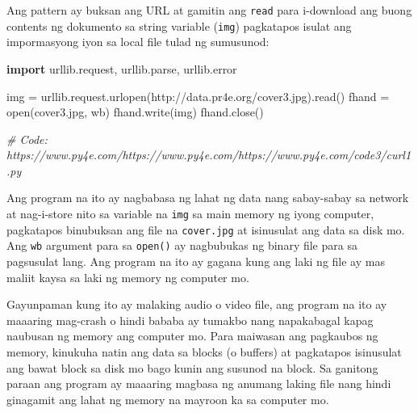 \documentclass[10pt,]{book}
\newenvironment{Shaded}{}{}
\newcommand{\BuiltInTok}[1]{\textcolor[rgb]{0.00,0.50,0.00}{#1}}
\newcommand{\CommentTok}[1]{\textcolor[rgb]{0.38,0.63,0.69}{\textit{#1}}}
\newcommand{\ImportTok}[1]{\textcolor[rgb]{0.00,0.50,0.00}{\textbf{#1}}}
\newcommand{\NormalTok}[1]{#1}
\newcommand{\OperatorTok}[1]{\textcolor[rgb]{0.40,0.40,0.40}{#1}}
\newcommand{\StringTok}[1]{\textcolor[rgb]{0.25,0.44,0.63}{#1}}
\begin{document}

Ang pattern ay buksan ang URL at gamitin ang \texttt{read} para
i-download ang buong contents ng dokumento sa string variable
(\texttt{img}) pagkatapos isulat ang impormasyong iyon sa local file
tulad ng sumusunod:

\begin{Shaded}
\begin{Highlighting}[]
\ImportTok{import}\NormalTok{ urllib.request, urllib.parse, urllib.error}

\NormalTok{img }\OperatorTok{=}\NormalTok{ urllib.request.urlopen(}\StringTok{\textquotesingle{}http://data.pr4e.org/cover3.jpg\textquotesingle{}}\NormalTok{).read()}
\NormalTok{fhand }\OperatorTok{=} \BuiltInTok{open}\NormalTok{(}\StringTok{\textquotesingle{}cover3.jpg\textquotesingle{}}\NormalTok{, }\StringTok{\textquotesingle{}wb\textquotesingle{}}\NormalTok{)}
\NormalTok{fhand.write(img)}
\NormalTok{fhand.close()}

\CommentTok{\# Code: https://www.py4e.com/https://www.py4e.com/https://www.py4e.com/code3/curl1.py}
\end{Highlighting}
\end{Shaded}

Ang program na ito ay nagbabasa ng lahat ng data nang sabay-sabay sa
network at nag-i-store nito sa variable na \texttt{img} sa main memory
ng iyong computer, pagkatapos binubuksan ang file na \texttt{cover.jpg}
at isinusulat ang data sa disk mo. Ang \texttt{wb} argument para sa
\texttt{open()} ay nagbubukas ng binary file para sa pagsusulat lang.
Ang program na ito ay gagana kung ang laki ng file ay mas maliit kaysa
sa laki ng memory ng computer mo.

Gayunpaman kung ito ay malaking audio o video file, ang program na ito
ay maaaring mag-crash o hindi bababa ay tumakbo nang napakabagal kapag
naubusan ng memory ang computer mo. Para maiwasan ang pagkaubos ng
memory, kinukuha natin ang data sa blocks (o buffers) at pagkatapos
isinusulat ang bawat block sa disk mo bago kunin ang susunod na block.
Sa ganitong paraan ang program ay maaaring magbasa ng anumang laking
file nang hindi ginagamit ang lahat ng memory na mayroon ka sa computer
mo.
\end{document}
